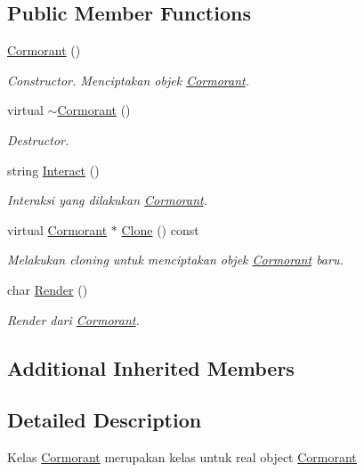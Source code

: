 \subsection*{Public Member Functions}
\begin{DoxyCompactItemize}
\item 
\hyperlink{classCormorant_a1c93b60af03db473c444783df366a2ae}{Cormorant} ()
\begin{DoxyCompactList}\small\item\em Constructor. Menciptakan objek \hyperlink{classCormorant}{Cormorant}. \end{DoxyCompactList}\item 
virtual \hyperlink{classCormorant_af24217c3b840dcf95b0961d68a241034}{$\sim$\+Cormorant} ()
\begin{DoxyCompactList}\small\item\em Destructor. \end{DoxyCompactList}\item 
string \hyperlink{classCormorant_af28984652ae999452d20aed885f0185a}{Interact} ()
\begin{DoxyCompactList}\small\item\em Interaksi yang dilakukan \hyperlink{classCormorant}{Cormorant}. \end{DoxyCompactList}\item 
virtual \hyperlink{classCormorant}{Cormorant} $\ast$ \hyperlink{classCormorant_a7be371562fab8ab5c2e9e72386ee9aa2}{Clone} () const 
\begin{DoxyCompactList}\small\item\em Melakukan cloning untuk menciptakan objek \hyperlink{classCormorant}{Cormorant} baru. \end{DoxyCompactList}\item 
char \hyperlink{classCormorant_a6d388885acfc98de6020a01b90259dac}{Render} ()
\begin{DoxyCompactList}\small\item\em Render dari \hyperlink{classCormorant}{Cormorant}. \end{DoxyCompactList}\end{DoxyCompactItemize}
\subsection*{Additional Inherited Members}


\subsection{Detailed Description}
Kelas \hyperlink{classCormorant}{Cormorant} merupakan kelas untuk real object \hyperlink{classCormorant}{Cormorant} 

